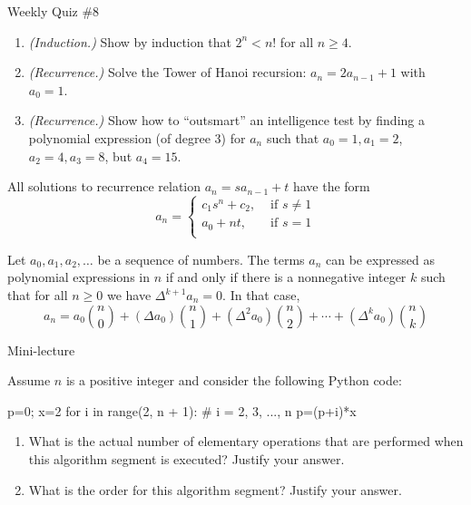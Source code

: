 \documentclass[10pt]{beamer}
\begin{document}
\begin{frame}{Weekly Quiz \#8}

\begin{enumerate}
	\item \textit{(Induction.)}   Show by induction that $2^n < n!$ for all $n \geq 4$.	
	\item \textit{(Recurrence.)} Solve the Tower of Hanoi recursion: $a_n = 2 a_{n-1} + 1$ with $a_0=1$.
	\item \textit{(Recurrence.)} Show how to \enquote{outsmart} an intelligence test by finding a polynomial expression (of degree 3) for $a_n$ such that $a_0=1, a_1=2$, $a_2=4, a_3=8$, but $a_4=15$.
\end{enumerate}
\vfill 
\scriptsize 
\begin{mygreenbox}[title=\text{Reference Material: Solving first-order recurrences (Props 23.1, 23.3)}]
All solutions to recurrence relation $a_n = s a_{n-1} + t$ have the form
\[
a_n = 
\begin{cases}
c_1 s^n + c_2, & \text{ if } s \neq 1 \\
a_0 + nt, & \text{ if } s = 1 \\
\end{cases}
\]
\end{mygreenbox}

\begin{mygreenbox}[title=\text{Reference Material: Expressing a sequence with a polynomial (Thm 23.17)}]
Let $a_0, a_1, a_2, \hdots$ be a sequence of numbers. The terms $a_n$ can be expressed as polynomial expressions in $n$ if and only if there is a nonnegative integer $k$ such that for all $n \geq 0$ we have $\Delta^{k+1} a_n = 0$. In that case,
\[a_n = a_0 \binom{n}{0} +  (\Delta a_0) \binom{n}{1}  + (\Delta^2 a_0) \binom{n}{2} + \cdots + (\Delta^k a_0) \binom{n}{k}  \]
\end{mygreenbox}


\end{frame}




\begin{frame}[standout]
Mini-lecture
\end{frame}

\begin{frame}[fragile]
\small 
\begin{myredbox}[title=Practice Reading Quiz (Algorithm Efficiency)]
Assume $n$ is a positive integer and consider the following Python code:


\begin{python}
p=0; x=2
for i in range(2, n + 1):       # i = 2, 3, ..., n
	p=(p+i)*x
\end{python}


\begin{enumerate}
	\item What is the actual number of elementary operations that are performed when this algorithm segment is executed? Justify your answer.
	\item What is the order for this algorithm segment? Justify your answer.
\end{enumerate}
\end{myredbox}
\end{frame}
\end{document}
